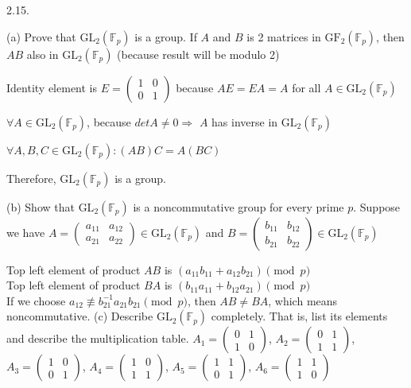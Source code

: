 2.15. 
 
(a) Prove that $\text{GL}_2(\mathbb{F}_p)$ is a group.
    If $A$ and $B$ is 2 matrices in $\text{GF}_2(\mathbb{F}_p)$, then $AB$ also in $\text{GL}_2(\mathbb{F}_p)$ (because result will be modulo 2)
    
    Identity element is $E = \begin{pmatrix}1 & 0\\0 & 1\end{pmatrix}$ because $AE=EA=A$ for all $A \in \text{GL}_2(\mathbb{F}_p)$
    
    $\forall A \in \text{GL}_2(\mathbb{F}_p)$, because $detA \neq 0 \Rightarrow$ $A$ has inverse in $\text{GL}_2(\mathbb{F}_p)$
    
    $\forall A, B, C \in \text{GL}_2(\mathbb{F}_p): (AB)C=A(BC)$
    
    Therefore, $\text{GL}_2(\mathbb{F}_p)$ is a group.

(b) Show that $\text{GL}_2(\mathbb{F}_p)$ is a noncommutative group for every prime $p$.
    Suppose we have $A = \begin{pmatrix}a_{11} & a_{12} \\ a_{21} & a_{22}\end{pmatrix} \in \text{GL}_2(\mathbb{F}_p)$ and $B=\begin{pmatrix}b_{11} & b_{12} \\ b_{21} & b_{22}\end{pmatrix} \in \text{GL}_2(\mathbb{F}_p)$
    
    Top left element of product $AB$ is $(a_{11}b_{11}+a_{12}b_{21}) \pmod p$ \\ Top left element of product $BA$ is $(b_{11}a_{11} + b_{12}a_{21}) \pmod p$ \\ If we choose $a_{12} \not\equiv b_{21}^{-1}a_{21}b_{21} \pmod p$, then $AB \neq BA$, which means noncommutative.
(c) Describe $\text{GL}_2(\mathbb{F}_p)$ completely. That is, list its elements and describe the multiplication table.
    $A_1 = \begin{pmatrix}0 & 1\\1 & 0\end{pmatrix}$, $A_2 = \begin{pmatrix}0 & 1\\1 & 1\end{pmatrix}$, $A_3 = \begin{pmatrix}1 & 0\\0 & 1\end{pmatrix}$, $A_4 = \begin{pmatrix}1 & 0\\1 & 1\end{pmatrix}$, $A_5 = \begin{pmatrix}1 & 1\\0 & 1\end{pmatrix}$, $A_6 = \begin{pmatrix}1 & 1\\1 & 0\end{pmatrix}$
    
